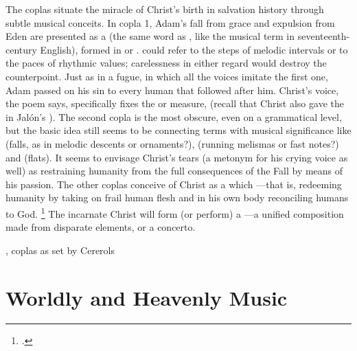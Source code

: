 
The coplas situate the miracle of Christ's birth in salvation history through
subtle musical conceits.
In copla 1, Adam's fall from grace and expulsion from Eden are presented as a
 (the same word as , like the musical term
 in seventeenth-century English), formed in 
or . 
 could refer to the steps of melodic intervals or to the paces
of rhythmic values; carelessness in either regard would destroy the
counterpoint.
Just as in a fugue, in which all the voices imitate the first one, Adam passed
on his sin to every human that followed after him.
Christ's voice, the poem says, specifically fixes the  or measure,
 (recall that Christ also gave the
 in Jalón's ).
The second copla is the most obscure, even on a grammatical level, but the basic
idea still seems to be connecting terms with musical significance like
 (falls, as in melodic descents or ornaments?), 
(running melismas or fast notes?) and  (flats).
It seems to envisage Christ's tears (a metonym for his crying voice as well) as
restraining humanity from the full consequences of the Fall by means of his
passion.
The other coplas conceive of Christ as a  which
---that is, redeeming
humanity by taking on frail human flesh and in his own body reconciling humans
to God.%
    \footnote{.}
The incarnate Christ will form (or perform) a ---a unified
composition made from disparate elements, or a concerto.


{, coplas as set by Cererols}


\section{Worldly and Heavenly Music}

